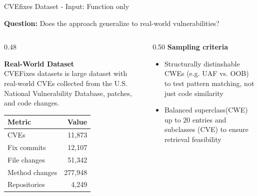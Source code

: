 \documentclass[aspectratio=169,10pt]{beamer}
\begin{document}
\begin{frame}{CVEfixes Dataset - Input: Function only}
  
  \textbf{Question:} Does the approach generalize to real-world vulnerabilities?
  \vspace{0.3cm}
  
\begin{columns}[T]
\begin{column}{0.48\textwidth}

  \textbf{Real-World Dataset}\\[3pt]
  {\small CVEFixes \cite{bhandari2021cvefixes} datasets is large dataset with real-world CVEs collected from the U.S. National Vulnerability Database, patches, and code changes.\\}
  
  \vspace{0.5em}
  \begin{center}
    
  \scriptsize
  \begin{tabular}{lr}
    \toprule
    \textbf{Metric} & \textbf{Value} \\
    \midrule
    CVEs & 11,873 \\
    Fix commits & 12,107 \\
    File changes & 51,342 \\
    Method changes & 277,948 \\
    Repositories & 4,249 \\
    \bottomrule
  \end{tabular}
  \end{center}
\end{column}
\begin{column}{0.50\textwidth}
    {\small\textbf{Sampling criteria}}\\[3pt]
  {\scriptsize
  \begin{itemize}\itemsep1pt
    \item Structurally distinshable CWEs (e.g. UAF vs. OOB) to test pattern matching, not just code similarity
    \item Balanced superclass(CWE) up to 20 entries and subclasses (CVE) to ensure retrieval feasibility
  \end{itemize}}
      \vspace{0.5em}
    \begin{center}


\end{center}
\end{column}
\end{columns}
\end{frame}
\end{document}
